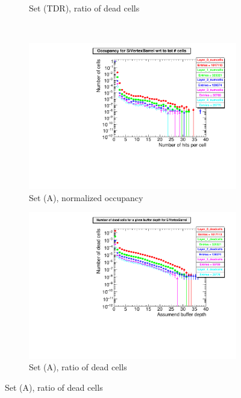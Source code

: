 \begin{figure}[!h]
\begin{subfigure}[b]{0.49\textwidth}
   \caption{Set (TDR), ratio of dead cells}
   \end{subfigure}\\
  \begin{subfigure}[b]{0.49\textwidth}
   \centering
    \includegraphics[width=\textwidth]{Figures/Pairs/Appendix/occupancy_numcells_SiVertexBarrel_ILC250_setA.pdf}
   \caption{Set (A), normalized occupancy}
   \end{subfigure}
   \hfill
    \begin{subfigure}[b]{0.49\textwidth}
   \centering
    \includegraphics[width=\textwidth]{Figures/Pairs/Appendix/occupancy_deadcells_SiVertexBarrel_ILC250_setA.pdf}
   \caption{Set (A), ratio of dead cells}
   \end{subfigure}
     \end{figure}
